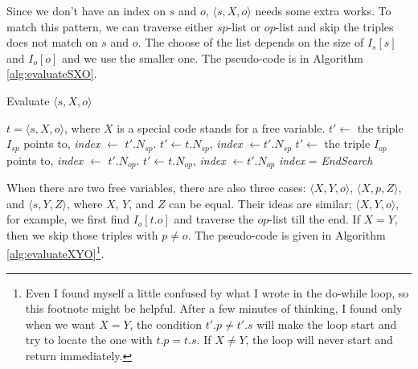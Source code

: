\documentclass{article}
\begin{document}
\begin{enumerate}
\begin{enumerate}
Since we don't have an index on $s$ and $o$,  $\langle s, X, o\rangle$ needs some extra works. To match this pattern, we can traverse either $sp$-list or $op$-list and skip the triples does not match on $s$ and $o$. The choose of the list depends on the size of $I_s[s]$ and $I_o[o]$ and we use the smaller one. The pseudo-code is in Algorithm \eqref{alg:evaluateSXO}.

\begin{algorithm}[H]
\caption{Evaluate $\langle s, X, o\rangle$}\label{alg:evaluateSXO}
\begin{algorithmic}
\Require $t = \langle s, X, o\rangle$, where $X$ is a special code stands for a free variable. 
\Do
{}
\State $t'\leftarrow$ the triple $I_{sp}$ points to, \textit{index} $\leftarrow$ $t'.N_{sp}$.
\Else 
\State $t'\leftarrow t.N_{sp}$, \textit{index} $\leftarrow t'.N_{sp}$
\EndIf
{}
\Else
\Do
{}
\State $t'\leftarrow$ the triple $I_{op}$ points to, \textit{index} $\leftarrow$ $t'.N_{op}$.
\Else 
\State $t'\leftarrow t.N_{op}$, \textit{index} $\leftarrow t'.N_{op}$
\EndIf
{}
\EndIf
{}
\State \textit{index} = \textit{EndSearch}
\EndIf 
\end{algorithmic}
\end{algorithm}


When there are two free variables, there are also three cases: $\langle X, Y, o\rangle$, $\langle X, p, Z\rangle$, and $\langle s, Y, Z\rangle$, where $X$, $Y$, and $Z$ can be equal. Their ideas are similar; $\langle X, Y, o\rangle$, for example, we first find $I_o[t.o]$ and traverse the $op$-list till the end. If $X=Y$, then we skip those triples with $p \neq o$. The pseudo-code is given in Algorithm \eqref{alg:evaluateXYO}\footnote{Even I found myself a little confused by what I wrote in the do-while loop, so this footnote might be helpful. After a few minutes of thinking, I found only when we want $X=Y$, the condition $t'.p \neq t'.s$ will make the loop start and try to locate the one with $t.p = t.s$. If $X\neq Y$, the loop will never start and return immediately.}.


\end{enumerate}
\end{enumerate}
\end{document}
